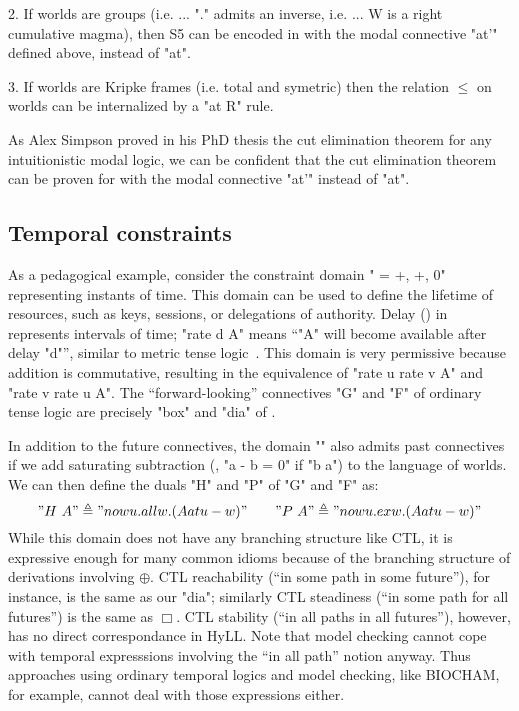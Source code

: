 \documentclass{article}
\begin{document}
2. If worlds are groups 
(i.e. $...$ "." admits an inverse, 
i.e. $...$ W is a right cumulative magma),
then S5 can be encoded in \hyll with the modal connective "at'" defined above, instead of "at".

3.  If worlds are Kripke frames (i.e. total and symetric) then the relation $\le$ on worlds
can be internalized by a "at R" rule.

As Alex Simpson proved in his PhD thesis the cut elimination theorem for any intuitionistic
modal logic, we can be confident that the cut elimination theorem can be proven for 
\hyll with the modal connective "at'" instead of "at".

\subsection{Temporal constraints}
\label{sec:hyllt}

As a pedagogical example, consider the constraint domain " = \langle
\Reals+, +, 0\rangle" representing instants of time. This domain can be used to
define the lifetime of resources, such as keys, sessions, or delegations of
authority. Delay () in \hyllt represents intervals of time;
"rate d A" means ``"A" will become available after delay "d"'', similar to
metric tense logic~\cite{prior57book}. This domain is very permissive because
addition is commutative, resulting in the equivalence of "rate u rate v A" and
"rate v rate u A".
The ``forward-looking'' connectives "G" and "F" of ordinary tense logic are
precisely "box" and "dia" of . 

In addition to the
future connectives, the domain "" also admits past connectives if we add
saturating subtraction (\ie, "a - b = 0" if "b \ge a") to the language of
worlds. We can then define the duals "H" and "P" of "G" and "F" as:
$$ "H~A" \triangleq "now u. all w. (A at u - w)" \qquad
   "P~A" \triangleq "now u. ex w. (A at u - w)"
$$
While this domain does not have any branching structure like CTL, it is
expressive enough for many common idioms because of the branching structure
of derivations involving $\oplus$. CTL reachability (``in some path in some
future''), for instance, is the same as our "dia"; similarly
CTL steadiness (``in some path for all futures'') is the same as $\Box$.
CTL stability (``in all paths in all futures''), however, has no direct correspondance in HyLL.
Note that model checking cannot cope with temporal expresssions involving the 
``in all path'' notion anyway. 
Thus approaches using ordinary temporal logics and model checking, 
like BIOCHAM, for example, cannot deal with those expressions either.
\end{document}
